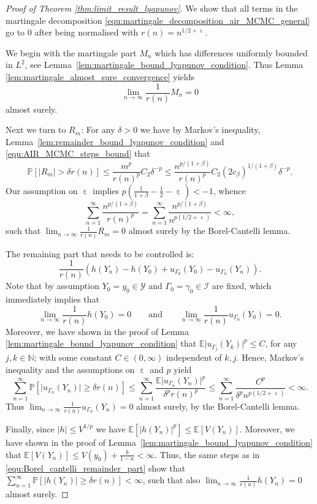 \documentclass[12pt]{article}
\theoremstyle{definition}
\newcommand{\N}{\mathbb{N}}
\newcommand{\E}{\mathbb{E}}
\newcommand{\cY}{\mathcal{Y}}
\DeclareMathOperator{\eps}{\varepsilon}
\begin{document}
\begin{proof}[Proof of Theorem \ref{thm:limit_result_lyapunov}]
	We show that all terms in the martingale decomposition \eqref{equ:martingale_decomposition_air_MCMC_general} go to $0$ after being normalised with $r(n) = n^{1/2+\eps}$.
	
	We begin with the martingale part $M_n$ which has differences uniformly bounded in $L^2$, see Lemma~\ref{lem:martingale_bound_lyapunov_condition}.
	Thus Lemma \ref{lem:martingale_almost_sure_convergence} yields 
	\[
	\lim_{n \to \infty}
	\frac{1}{r(n)} M_n =0
	\]
	almost surely. 
	

Next we turn to $R_m$: For any $\delta>0$ we have by Markov's inequality, Lemma~\ref{lem:remainder_bound_lyapunov_condition} and \eqref{equ:AIR_MCMC_steps_bound} that
	\[
	\mathbb{P}\left[ \left\vert R_m \right\vert > \delta r(n) \right] \leq 
	\frac{m^p}{r(n)^p} C_2 \delta^{-p} 
	\leq
	\frac{n^{p/(1+\beta)}}{r(n)^p} C_2 (2c_\beta)^{1/(1+\beta)} \delta^{-p}.
	\]
	Our assumption on $\eps$ implies $p(\frac{1}{1+\beta}-\frac{1}{2} - \eps) < -1$, whence
	\[
	\sum_{n=1}^\infty\frac{n^{p/(1+\beta)}}{r(n)^p} = \sum_{n=1}^\infty\frac{n^{p/(1+\beta)}}{n^{p(1/2+\eps)}} <\infty,
	\]
	such that $\lim_{n \to \infty}\frac{1}{r(n)}R_m =0$ almost surely by the Borel-Cantelli lemma.
	
	\medskip
	The remaining part that needs to be controlled is:
	\[
	\frac{1}{r(n)}\left( h(Y_n) - h(Y_0) 
	+{u}_{\Gamma_0}(Y_0) - {u}_{\Gamma_{n}}(Y_n) \right) .
	\]
	Note that by assumption $Y_0 = y_0 \in \cY$ and $\Gamma_0=\gamma_0 \in \mathcal{I}$ are fixed, which immediately implies that
		\[
		\lim_{n \to \infty}	\frac{1}{r(n)}h(Y_0) =0 \qquad \text{and} \qquad \lim_{n \to \infty}\frac{1}{r(n)}u_{\Gamma_0}(Y_0) = 0.
		\]
		Moreover, we have shown in the proof of Lemma \ref{lem:martingale_bound_lyapunov_condition} that $\E \vert u_{\Gamma_{j}} (Y_k) \vert^p \leq C $, for any $j,k \in \N$; with some constant $C \in (0, \infty)$ independent of $k,j$.
		Hence, Markov's inequality and the assumptions on $\eps$ and $p$ yield
		\begin{equation}\label{equ:Borel_cantelli_remainder_part}
			\sum_{n=1}^\infty \mathbb{P}\left[ \vert u_{\Gamma_n}(Y_n) \vert \geq \delta r(n)  \right] \leq \sum_{n=1}^{\infty} \frac{\E \vert u_{\Gamma_{n}} (Y_n) \vert^p }{\delta^p r(n)^p} \leq \sum_{n=1}^{\infty} \frac{C^p}{\delta^p n^{p(1/2+\eps)}} < \infty.
		\end{equation}
		Thus $\lim_{n \to \infty} \frac{1}{r(n)} u_{\Gamma_n}(Y_n) =0$ almost surely, by the Borel-Cantelli lemma.
		
		Finally, since $\vert h \vert \leq V^{1/p}$ we have $\E [\vert h(Y_n) \vert^p ] \leq \E[V(Y_n)]$. Moreover, we have shown in the proof of Lemma~\ref{lem:martingale_bound_lyapunov_condition} that $\E[V(Y_n)] \leq V(y_0) + \frac{b}{1-\kappa} < \infty$.
		Thus, the same steps as in \eqref{equ:Borel_cantelli_remainder_part} show that $\sum_{n=1}^\infty \mathbb{P}\left[ \vert h(Y_n) \vert \geq \delta r(n)  \right] < \infty$, such that also $\lim_{n \to \infty}\frac{1}{r(n)}h(Y_n) =0$ almost surely. 
\end{proof}
\end{document}
